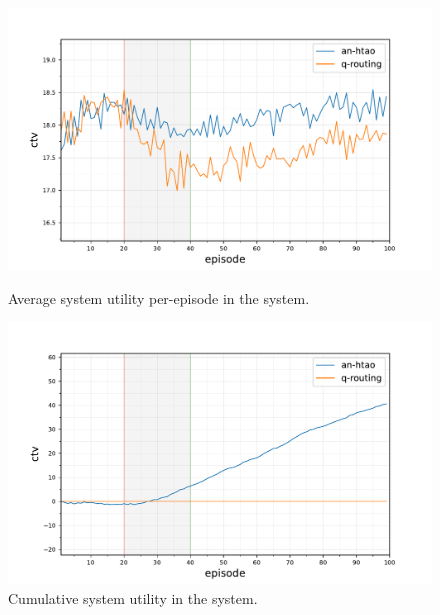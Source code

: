 \begin{figure}[ht]
	\begin{minipage}{.49\textwidth}
		\centering
		\includegraphics[width=1.0\linewidth,trim={25pt 0pt 50pt 0pt},clip]{7balanced_statistics-optimal-ctv}
		\captionsetup{labelfont=bf,singlelinecheck=on}
		\caption{Average system utility per-episode in the \newline \simulationNodeFailure{}{} system.}
		\label{fig:node_failure_ctv}
\end{minipage}
\begin{minipage}{.49\textwidth}
	\centering
	\includegraphics[width=1.0\linewidth,trim={25pt 0pt 50pt 0pt},clip]{7comparison_statistics-optimal-ctv-comparison-cumulative}
	\captionsetup{labelfont=bf,singlelinecheck=on}
		\caption{Cumulative system utility in the \simulationNodeFailure{}{}\newline system.}
		\label{fig:node_failure_cumulative_ctv}
\end{minipage}\hfill%
\end{figure}

